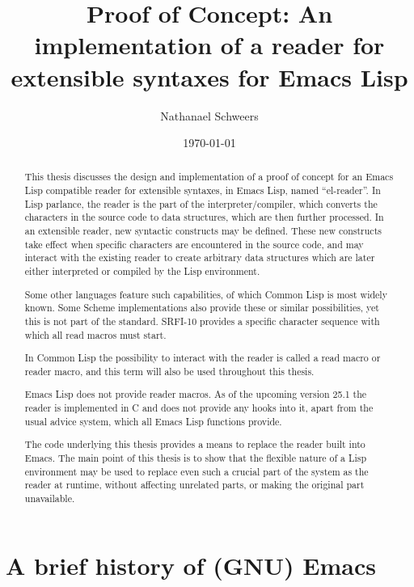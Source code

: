 \documentclass[a4paper,10pt,twoside]{article}
\author{Nathanael Schweers}
\date{\today}
\title{Proof of Concept: An implementation of a reader for extensible syntaxes for Emacs Lisp}
\newcommand{\el}{Emacs Lisp}
\newcommand{\cl}{Common Lisp}
\newcommand{\elr}{el-reader}
\begin{document}
\maketitle
\tableofcontents

\begin{abstract}
  This thesis discusses the design and implementation of a proof of concept for
  an \el{} compatible reader for extensible syntaxes, in \el{}, named
  ``\elr{}''.  In Lisp parlance, the reader is the part of the
  interpreter/compiler, which converts the characters in the source code to data
  structures, which are then further processed.  In an extensible reader, new
  syntactic constructs may be defined.  These new constructs take effect when
  specific characters are encountered in the source code, and may interact with
  the existing reader to create arbitrary data structures which are later either
  interpreted or compiled by the Lisp environment.

  Some other languages feature such capabilities, of which \cl{} is most widely
  known.  Some Scheme implementations also provide these or similar
  possibilities, yet this is not part of the standard.  SRFI-10 provides a
  specific character sequence with which all read macros must
  start. \cite{srfi-10}

  In \cl{} the possibility to interact with the reader is called a read macro or
  reader macro, and this term will also be used throughout this thesis.

  \el{} does not provide reader macros.  As of the upcoming version 25.1 the
  reader is implemented in C and does not provide any hooks into it, apart from
  the usual advice system, which all \el{} functions provide.

  The code underlying this thesis provides a means to replace the reader built
  into Emacs.  The main point of this thesis is to show that the flexible nature
  of a Lisp environment may be used to replace even such a crucial part of the
  system as the reader at runtime, without affecting unrelated parts, or making
  the original part unavailable.
\end{abstract}

\section{A brief history of (GNU) Emacs}
\label{sec:emacs-intro}
\end{document}
